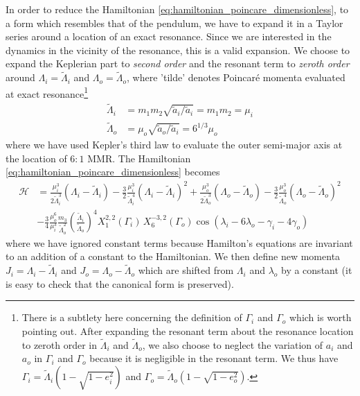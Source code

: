 \documentclass[twoside,openright,titlepage,numbers=noenddot,headinclude,%
                footinclude=true,cleardoublepage=empty,abstractoff, 
                BCOR=5mm,paper=a4,fontsize=11pt,%
                american,%
                ]{scrreprt}%
\begin{document}
In order to reduce the Hamiltonian \ref{eq:hamiltonian_poincare_dimensionless},
to a form which resembles that of the pendulum, we have to expand it in a 
Taylor series around a location of an exact resonance. Since we are interested
in the dynamics in the vicinity of the resonance, this is a valid expansion.
We choose to expand the Keplerian part to \emph{second order} and the
resonant term to \emph{zeroth order} around $\Lambda_i=\tilde{\Lambda}_i$ 
and $\Lambda_o=\tilde{\Lambda}_o$, where 'tilde' denotes Poincaré
momenta evaluated at exact resonance\footnote{There is a subtlety  here concerning the
definition of $\Gamma_i$ and $\Gamma_o$ which is worth pointing out. After expanding the
resonant term about the resonance location to zeroth order in 
$\tilde{\Lambda}_i$ and $\tilde{\Lambda}_o$, we also choose to neglect
the variation of $a_i$ and $a_o$ in $\Gamma_i$ and $\Gamma_o$
because it is negligible in the resonant term. 
We thus have $\Gamma_i=\tilde{\Lambda}_i\left(1-\sqrt{1-e_i^2}\right)$ and
$\Gamma_o=\tilde{\Lambda}_o\left(1-\sqrt{1-e_o^2}\right)$.}
\begin{equation}
    \begin{aligned}
        \tilde{\Lambda}_i&=m_1m_2\sqrt{\tilde{a}_i/\tilde{a}_i}=m_1m_2=\mu_i\\
        \tilde{\Lambda}_o&=\mu_o\sqrt{\tilde{a}_o/\tilde{a}_i}=6^{1/3}\mu_o
    \end{aligned}
\end{equation}
where we have used Kepler's third law to evaluate the outer semi-major axis
at the location of $6:1$ MMR. The Hamiltonian 
\ref{eq:hamiltonian_poincare_dimensionless} becomes
\begin{equation}
    \begin{aligned}
        \mathcal{H}&=\frac{\mu_i^3}{2\tilde{\Lambda}_i^3}
        (\Lambda_i-\tilde{\Lambda}_i) - \frac{3}{2}
        \frac{\mu_i^3}{\tilde{\Lambda}_i^4} (\Lambda_i-\tilde{\Lambda}_i)^2+
    \frac{\mu_o^3}{2\tilde{\Lambda}_o^3}
        (\Lambda_o-\tilde{\Lambda}_o) - \frac{3}{2}
        \frac{\mu_o^3}{\tilde{\Lambda}_o^4} (\Lambda_o-\tilde{\Lambda}_o)^2\\
        &-\frac{3}{4} \frac{\mu_o^6}{\mu_i^3} 
        \frac{m_3}{\tilde{\Lambda}_o^2} \left(\frac{\tilde{\Lambda}_i}
        {\tilde{\Lambda}_o}\right)^4
    X^{2,2}_1(\Gamma_i)\,X^{-3,2}_6(\Gamma_o)\cos(\lambda_i-6\lambda_o
    -\gamma_i - 4\gamma_o)
    \end{aligned}
    \label{eq:hamiltonian_poincare_dimensionless_expanded}
\end{equation}
where we have ignored constant terms because Hamilton's equations are invariant
to an addition of a constant to the Hamiltonian. We then define new momenta
$J_i=\Lambda_i-\tilde{\Lambda}_i$ and $J_o=\Lambda_o-\tilde{\Lambda}_o$ 
which are shifted from $\Lambda_i$ and $\lambda_o$ by a constant (it is easy 
to check that the canonical form is preserved).
\end{document}
